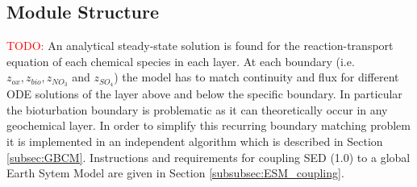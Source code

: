 \documentclass[gmd, manuscript]{copernicus}
\begin{document}
\subsection{Module Structure}
\textcolor{red}{TODO: }
An analytical steady-state solution is found for the reaction-transport equation of each chemical species in each layer. 
At each boundary (i.e. $z_{ox}, z_{bio}, z_{NO_3}$ and $z_{SO_4}$) the model has to match continuity and flux for different ODE solutions of the layer above and below the specific boundary. 
In particular the bioturbation boundary is problematic as it can theoretically occur in any geochemical layer. In order to simplify this recurring boundary matching problem it is implemented in an independent algorithm 
which is described in Section \ref{subsec:GBCM}. Instructions and requirements for coupling SED (1.0) to a global Earth Sytem Model are given in Section \ref{subsubsec:ESM_coupling}.
\end{document}

